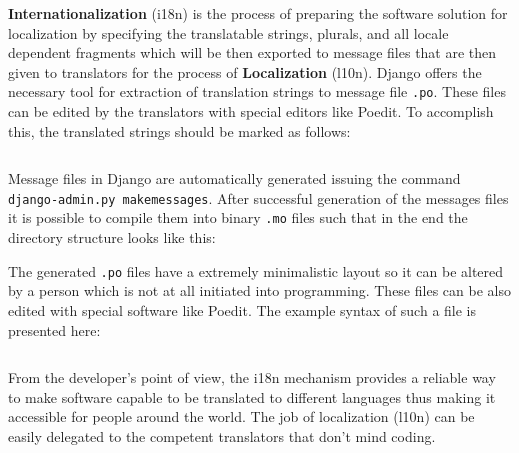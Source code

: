 \documentclass[12pt,oneside,a4paper]{article}
\begin{document}
\textbf{Internationalization} (i18n) is the process of preparing the software solution for localization by specifying the translatable strings, plurals, and all locale dependent fragments which will be then exported to message files that are then given to translators for the process of \textbf{Localization} (l10n). Django offers the necessary tool for extraction of translation strings to message file \texttt{.po}. These files can be edited by the translators with special editors like Poedit. To accomplish this, the translated strings should be marked as follows:
\inputminted[linenos,baselinestretch=1,xleftmargin=0.5cm]{python}{src/i18n-1.py}

Message files in Django are automatically generated issuing the command \texttt{django-admin.py makemessages}. After successful generation of the messages files it is possible to compile them into binary \texttt{.mo} files such that in the end the directory structure looks like this:

The generated \texttt{.po} files have a extremely minimalistic layout so it can be altered by a person which is not at all initiated into programming. These files can be also edited with special software like Poedit. The example syntax of such a file is presented here:
\inputminted[linenos,baselinestretch=1,xleftmargin=0.5cm]{python}{src/i18n-2.py}

From the developer's point of view, the i18n mechanism provides a reliable way to make software capable to be translated to different languages thus making it accessible for people around the world. The job of localization (l10n) can be easily delegated to the competent translators that don't mind coding.
\end{document}
